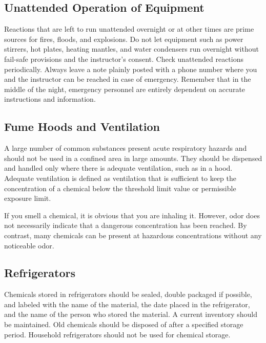 \documentclass[letterpaper,10pt,english]{sphinxmanual}
\begin{document}
\subsection{Unattended Operation of Equipment}
\label{\detokenize{Laboratory_Safety/Laboratory_Safety:unattended-operation-of-equipment}}
Reactions that are left to run unattended overnight or at other times are prime sources for fires, floods, and explosions. Do not let equipment such as power stirrers, hot plates, heating mantles, and water condensers run overnight without fail-safe provisions and the instructor’s consent. Check unattended reactions periodically. Always leave a note plainly posted with a phone number where you and the instructor can be reached in case of emergency. Remember that in the middle of the night, emergency personnel are entirely dependent on accurate instructions and information.


\subsection{Fume Hoods and Ventilation}
\label{\detokenize{Laboratory_Safety/Laboratory_Safety:fume-hoods-and-ventilation}}
A large number of common substances present acute respiratory hazards and should not be used in a confined area in large amounts. They should be dispensed and handled only where there is adequate ventilation, such as in a hood. Adequate ventilation is defined as ventilation that is sufficient to keep the concentration of a chemical below the threshold limit value or permissible exposure limit.

If you smell a chemical, it is obvious that you are inhaling it. However, odor does not necessarily indicate that a dangerous concentration has been reached. By contrast, many chemicals can be present at hazardous concentrations without any noticeable odor.


\subsection{Refrigerators}
\label{\detokenize{Laboratory_Safety/Laboratory_Safety:refrigerators}}
Chemicals stored in refrigerators should be sealed, double packaged if possible, and labeled with the name of the material, the date placed in the refrigerator, and the name of the person who stored the material. A current inventory should be maintained. Old chemicals should be disposed of after a specified storage period. Household refrigerators should not be used for chemical storage.
\end{document}

